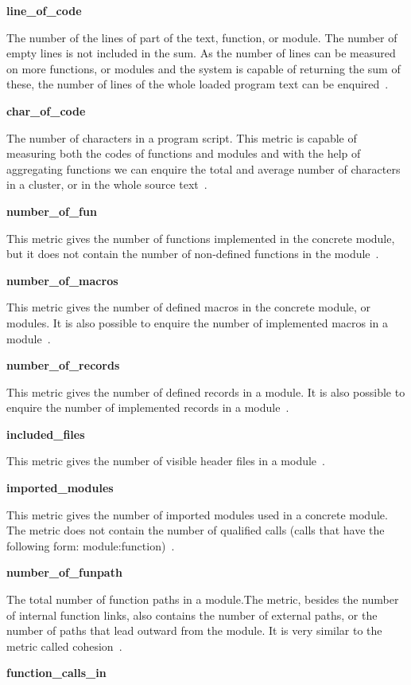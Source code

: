 \textbf{line\_of\_code}

The number of the lines of part of the text, function, or module. The number of empty lines is not included in the sum. As the number of lines can be measured on more functions, or modules and the system is capable of returning the sum of these, the number of lines of the whole loaded program text can be enquired~\cite{refactorerlm}.

\textbf{char\_of\_code}

The number of characters in a program script. This metric is capable of measuring both the codes of functions and modules and with the help of aggregating functions we can enquire the total and average number of characters in a cluster, or in the whole source text~\cite{refactorerlm}.

\textbf{number\_of\_fun}

This metric gives the number of functions implemented in the concrete module, but it does not contain the number of non-defined functions in the module~\cite{refactorerlm}.

\textbf{number\_of\_macros}

This metric gives the number of defined macros in the concrete module, or modules. It is also possible to enquire the number of implemented macros in a module~\cite{refactorerlm}.

\textbf{number\_of\_records}

 This metric gives the number of defined records in a module. It is also possible to enquire the number of implemented records in a module~\cite{refactorerlm}.

\textbf{included\_files}

This metric gives the number of visible header files in a module~\cite{refactorerlm}.

\textbf{imported\_modules}

This metric gives the number of imported modules used in a concrete module. The metric does not contain the number of qualified calls (calls that have the following form: module:function)~\cite{refactorerlm}.

\textbf{number\_of\_funpath}

The total number of function paths in a module.The metric, besides the number of internal function links, also contains the number of external paths, or the number of paths that lead outward from the module. It is very similar to the metric called cohesion~\cite{refactorerlm}.

\textbf{function\_calls\_in}

